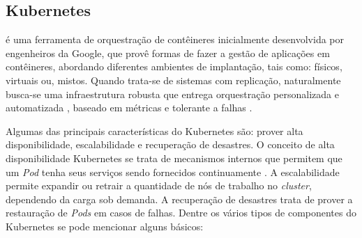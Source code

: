 


\subsection{Kubernetes}

\textcite{kubernetes/docs/2022} é uma ferramenta de orquestração de contêineres inicialmente desenvolvida por engenheiros da Google, que provê formas de fazer a gestão de aplicações em contêineres, abordando diferentes ambientes de implantação, tais como: físicos, virtuais ou, mistos. Quando trata-se de sistemas com replicação, naturalmente busca-se uma infraestrutura robusta que entrega orquestração personalizada e automatizada \cite{Stubbs2015DistributedSO}, baseado em métricas e tolerante a falhas \cite{vayghan2021kubernetes}.

Algumas das principais características do Kubernetes são: prover alta disponibilidade, escalabilidade e recuperação de desastres. O conceito de alta disponibilidade Kubernetes se trata de mecanismos internos que permitem que um \textit{Pod} tenha seus serviços sendo fornecidos continuamente \cite{vayghan2021kubernetes}. A escalabilidade permite expandir ou retrair a quantidade de nós de trabalho no \textit{cluster}, dependendo da carga sob demanda. A recuperação de desastres trata de prover a restauração de \textit{Pods} em casos de falhas. Dentre os vários tipos de componentes do Kubernetes se pode mencionar alguns básicos:

